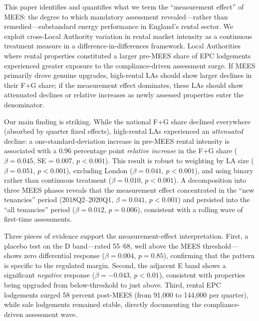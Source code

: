 \documentclass[12pt]{article}
\begin{document}
This paper identifies and quantifies what we term the ``measurement effect'' of MEES: the degree to which mandatory assessment revealed---rather than remedied---substandard energy performance in England's rental sector. We exploit cross-Local Authority variation in rental market intensity as a continuous treatment measure in a difference-in-differences framework. Local Authorities where rental properties constituted a larger pre-MEES share of EPC lodgements experienced greater exposure to the compliance-driven assessment surge. If MEES primarily drove genuine upgrades, high-rental LAs should show larger declines in their F+G share; if the measurement effect dominates, these LAs should show attenuated declines or relative increases as newly assessed properties enter the denominator.

Our main finding is striking. While the national F+G share declined everywhere (absorbed by quarter fixed effects), high-rental LAs experienced an \textit{attenuated} decline: a one-standard-deviation increase in pre-MEES rental intensity is associated with a 0.96 percentage point \textit{relative increase} in the F+G share ($\beta = 0.045$, SE = 0.007, $p < 0.001$). This result is robust to weighting by LA size ($\beta = 0.051$, $p < 0.001$), excluding London ($\beta = 0.041$, $p < 0.001$), and using binary rather than continuous treatment ($\beta = 0.010$, $p < 0.001$). A decomposition into three MEES phases reveals that the measurement effect concentrated in the ``new tenancies'' period (2018Q2--2020Q1, $\beta = 0.041$, $p < 0.001$) and persisted into the ``all tenancies'' period ($\beta = 0.012$, $p = 0.006$), consistent with a rolling wave of first-time assessments.

Three pieces of evidence support the measurement-effect interpretation. First, a placebo test on the D band---rated 55--68, well above the MEES threshold---shows zero differential response ($\beta = 0.004$, $p = 0.85$), confirming that the pattern is specific to the regulated margin. Second, the adjacent E band shows a significant \textit{negative} response ($\beta = -0.043$, $p < 0.01$), consistent with properties being upgraded from below-threshold to just above. Third, rental EPC lodgements surged 58 percent post-MEES (from 91,000 to 144,000 per quarter), while sale lodgements remained stable, directly documenting the compliance-driven assessment wave.
\end{document}
